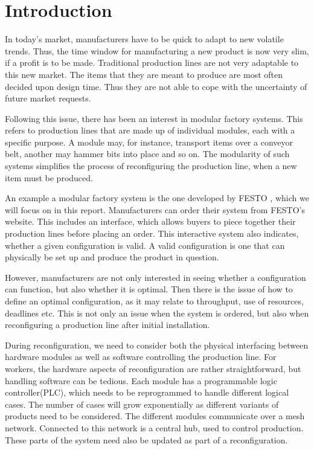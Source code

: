 \chapter{Introduction}
\label{ch:introduction}
In today’s market, manufacturers have to be quick to adapt to new volatile trends. Thus, the time window for manufacturing a new product is now very slim, if a profit is to be made. Traditional production lines are not very adaptable to this new market. The items that they are meant to produce are most often decided upon design time. Thus they are not able to cope with the uncertainty of future market requests.

Following this issue, there has been an interest in modular factory systems. This refers to production lines that are made up of individual modules, each with a specific purpose. A module may, for instance, transport items over a conveyor belt, another may hammer bits into place and so on. The modularity of such systems simplifies the process of reconfiguring the production line, when a new item must be produced.

An example a modular factory system is the one developed by FESTO \cite{FESTOweb}, which we will focus on in this report. Manufacturers can order their system from FESTO’s website. This includes an interface, which allows buyers to piece together their production lines before placing an order. This interactive system also indicates, whether a given configuration is valid. A valid configuration is one that can physically be set up and produce the product in question. 

However, manufacturers are not only interested in seeing whether a configuration can function, but also whether it is optimal. Then there is the issue of how to define an optimal configuration, as it may relate to throughput, use of resources, deadlines etc. This is not only an issue when the system is ordered, but also when reconfiguring a production line after initial installation.

During reconfiguration, we need to consider both the physical interfacing between hardware modules as well as software controlling the production line. For workers, the hardware aspects of reconfiguration are rather straightforward, but handling software can be tedious. Each module has a programmable logic controller(PLC), which needs to be reprogrammed to handle different logical cases. The number of cases will grow exponentially as different variants of products need to be considered.  The different modules communicate over a mesh network. Connected to this network is a central hub, used to control production.  These parts of the system need also be updated as part of a reconfiguration.

